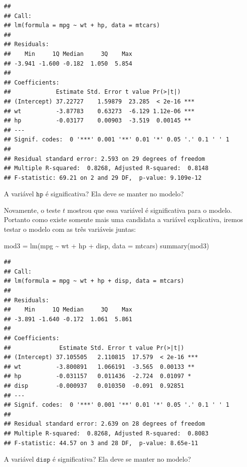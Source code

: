 \documentclass[
]{book}
\newenvironment{Shaded}{\begin{snugshade}}{\end{snugshade}}
\newcommand{\AttributeTok}[1]{\textcolor[rgb]{0.77,0.63,0.00}{#1}}
\newcommand{\FunctionTok}[1]{\textcolor[rgb]{0.00,0.00,0.00}{#1}}
\newcommand{\NormalTok}[1]{#1}
\newcommand{\OtherTok}[1]{\textcolor[rgb]{0.56,0.35,0.01}{#1}}
\newcommand{\SpecialCharTok}[1]{\textcolor[rgb]{0.00,0.00,0.00}{#1}}
\begin{document}
\begin{verbatim}
## 
## Call:
## lm(formula = mpg ~ wt + hp, data = mtcars)
## 
## Residuals:
##    Min     1Q Median     3Q    Max 
## -3.941 -1.600 -0.182  1.050  5.854 
## 
## Coefficients:
##             Estimate Std. Error t value Pr(>|t|)    
## (Intercept) 37.22727    1.59879  23.285  < 2e-16 ***
## wt          -3.87783    0.63273  -6.129 1.12e-06 ***
## hp          -0.03177    0.00903  -3.519  0.00145 ** 
## ---
## Signif. codes:  0 '***' 0.001 '**' 0.01 '*' 0.05 '.' 0.1 ' ' 1
## 
## Residual standard error: 2.593 on 29 degrees of freedom
## Multiple R-squared:  0.8268, Adjusted R-squared:  0.8148 
## F-statistic: 69.21 on 2 and 29 DF,  p-value: 9.109e-12
\end{verbatim}

A variável \(\texttt{hp}\) é significativa? Ela deve se manter no modelo?

Novamente, o teste \(t\) mostrou que essa variável é significativa para o modelo. Portanto como existe somente mais uma candidata a variável explicativa, iremos testar o modelo com as três variáveis juntas:

\begin{Shaded}
\begin{Highlighting}[]
\NormalTok{mod3 }\OtherTok{=} \FunctionTok{lm}\NormalTok{(mpg }\SpecialCharTok{\textasciitilde{}}\NormalTok{ wt }\SpecialCharTok{+}\NormalTok{ hp }\SpecialCharTok{+}\NormalTok{ disp, }\AttributeTok{data =}\NormalTok{ mtcars)}
\FunctionTok{summary}\NormalTok{(mod3)}
\end{Highlighting}
\end{Shaded}

\begin{verbatim}
## 
## Call:
## lm(formula = mpg ~ wt + hp + disp, data = mtcars)
## 
## Residuals:
##    Min     1Q Median     3Q    Max 
## -3.891 -1.640 -0.172  1.061  5.861 
## 
## Coefficients:
##              Estimate Std. Error t value Pr(>|t|)    
## (Intercept) 37.105505   2.110815  17.579  < 2e-16 ***
## wt          -3.800891   1.066191  -3.565  0.00133 ** 
## hp          -0.031157   0.011436  -2.724  0.01097 *  
## disp        -0.000937   0.010350  -0.091  0.92851    
## ---
## Signif. codes:  0 '***' 0.001 '**' 0.01 '*' 0.05 '.' 0.1 ' ' 1
## 
## Residual standard error: 2.639 on 28 degrees of freedom
## Multiple R-squared:  0.8268, Adjusted R-squared:  0.8083 
## F-statistic: 44.57 on 3 and 28 DF,  p-value: 8.65e-11
\end{verbatim}

A variável \(\texttt{disp}\) é significativa? Ela deve se manter no modelo?
\end{document}
